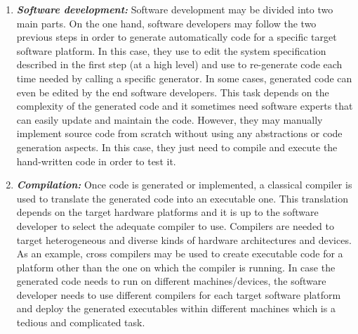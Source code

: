 \begin{enumerate}
	
	
	\item \textbf{\textit{Software development:}}
	Software development may be divided into two main parts. On the one hand, software developers may follow the two previous steps in order to generate automatically code for a specific target software platform. In this case, they use to edit the system specification described in the first step (at a high level) and use to re-generate code each time needed by calling a specific generator. In some cases, generated code can even be edited by the end software developers. This task depends on the complexity of the generated code and it sometimes need software experts that can easily update and maintain the code. However, they may manually implement source code from scratch without using any abstractions or code generation aspects. In this case, they just need to compile and execute the hand-written code in order to test it.
	
	\item \textbf{\textit{Compilation:}}
	Once code is generated or implemented, a classical compiler is used to translate the generated code into an executable one. This translation depends on the target hardware platforms and it is up to the software developer to select the adequate compiler to use. Compilers are needed to target heterogeneous and diverse kinds of hardware architectures and devices. 
	As an example, cross compilers may be used to create executable code for a platform other than the one on which the compiler is running. In case the generated code needs to run on different machines/devices, the software developer needs to use different compilers for each target software platform and deploy the generated executables within different machines which is a tedious and complicated task.
	
\end{enumerate} 


